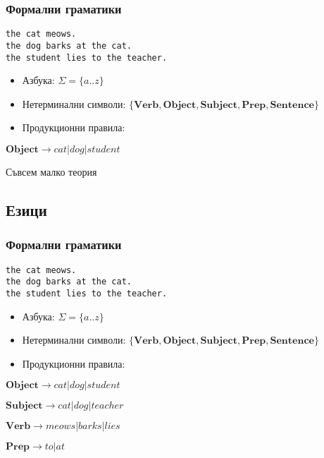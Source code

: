 \documentclass{beamer}
\begin{document}
\begin{frame}[fragile]
\frametitle{Формални граматики}

\begin{verbatim}
the cat meows.
the dog barks at the cat.
the student lies to the teacher.
\end{verbatim}

\pause

\begin{itemize}
  \item Азбука: $\Sigma=\{a..z\}$
  \item Нетерминални символи: $\{\mathbf{Verb},\mathbf{Object},\mathbf{Subject}, \mathbf{Prep}, \mathbf{Sentence}\}$
  \item Продукционни правила:
\end{itemize}

\pause

$\mathbf{Object} \rightarrow cat | dog | student$
\begin{frame}
\centerline{Съвсем малко теория}
\end{frame}


\subsection{Езици}


\begin{frame}[fragile]
\frametitle{Формални граматики}

\begin{verbatim}
the cat meows.
the dog barks at the cat.
the student lies to the teacher.
\end{verbatim}

\pause

\begin{itemize}
  \item Азбука: $\Sigma=\{a..z\}$
  \item Нетерминални символи: $\{\mathbf{Verb},\mathbf{Object},\mathbf{Subject}, \mathbf{Prep}, \mathbf{Sentence}\}$
  \item Продукционни правила:
\end{itemize}

\pause

$\mathbf{Object} \rightarrow cat | dog | student$

$\mathbf{Subject} \rightarrow cat | dog | teacher$

$\mathbf{Verb} \rightarrow meows | barks | lies$

$\mathbf{Prep} \rightarrow to | at$


\end{frame}
\end{frame}
\end{document}
